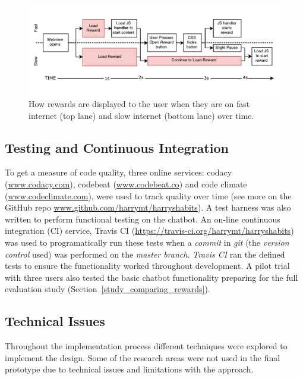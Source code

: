 \begin{figure}[H]
    \centering
    \includegraphics[width=6in]{../resources/diagrams/webview-flow-diagram.pdf}
    \caption{How rewards are displayed to the user when they are on fast internet (top lane) and slow internet (bottom lane) over time.}
    \label{fig:fast_slow_opening_rewards}
\end{figure}


\subsection{Testing and Continuous Integration}
To get a measure of code quality, three online services: codacy (\url{www.codacy.com}), codebeat (\url{www.codebeat.co}) and code climate (\url{www.codeclimate.com}), were used to track quality over time (see more on the GitHub repo \url{www.github.com/harrymt/harryshabits}). A test harness was also written to perform functional testing on the chatbot. An on-line continuous integration (CI) service, Travis CI (\url{https://travis-ci.org/harrymt/harryshabits}) was used to programatically run these tests when a \textit{commit} in \textit{git} (the \textit{version control} used) was performed on the \textit{master branch}. \textit{Travis CI} ran the defined tests to ensure the functionality worked throughout development. A pilot trial with three users also tested the basic chatbot functionality preparing for the full evaluation study (Section~\ref{study_comparing_rewards}).

\subsection{Technical Issues}
Throughout the implementation process different techniques were explored to implement the design.
Some of the research areas were not used in the final prototype due to technical issues and limitations with the approach.

